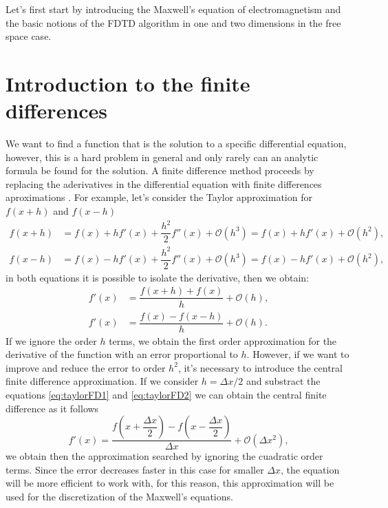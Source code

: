 \documentclass[12pt, oneside]{book}
\begin{document}
Let's first start by introducing the Maxwell's equation of electromagnetism and the basic notions of the FDTD algorithm in one and two dimensions in the free space case.

\section{Introduction to the finite differences}

We want to find a function that is the solution to a specific differential equation, however, this is a hard problem in general and only rarely can an analytic formula be found for the solution. A finite difference method proceeds by replacing the aderivatives in the differential equation with finite differences aproximations \cite{LeVeque,Burden-2016}. For example, let's consider the Taylor approximation for $f(x+h)$ and $f(x-h)$
\begin{align}
    f(x+h) &= f(x) + h  f'(x) + \dfrac{h^2}{2}f''(x) + \mathcal{O}(h^3) = f(x) + h  f'(x) + \mathcal{O}(h^2), \label{eq:taylorFD1}\\
    f(x-h) &= f(x) - h  f'(x) + \dfrac{h^2}{2}f''(x) + \mathcal{O}(h^3) = f(x) - h  f'(x) + \mathcal{O}(h^2),
    \label{eq:taylorFD2}
\end{align}
in both equations it is possible to isolate the derivative, then we obtain:
\begin{align}
    f'(x) &= \dfrac{f(x+h)+f(x)}{h} + \mathcal{O}(h), \\
    f'(x) &= \dfrac{f(x)-f(x-h)}{h} + \mathcal{O}(h).
\end{align}
If we ignore the order $h$ terms, we obtain the first order approximation for the derivative of the function with an error proportional to $h$. However, if we want to improve and reduce the error to order $h^2$, it's necessary to introduce the central finite difference approximation. If we consider $h=\Delta x/2$ and substract the equations \ref{eq:taylorFD1} and \ref{eq:taylorFD2} we can obtain the central finite difference as it follows
\begin{equation}
    f'(x) = \dfrac{f\left( x+ \dfrac{\Delta x}{2} \right) - f\left( x - \dfrac{\Delta x}{2} \right)}{\Delta x} + \mathcal{O}(\Delta x^2),
\end{equation}
we obtain then the approximation searched by ignoring the cuadratic order terms. Since the error decreases faster in this case for smaller $\Delta x$, the equation will be more efficient to work with, for this reason, this approximation will be used for the discretization of the Maxwell's equations.
\end{document}
